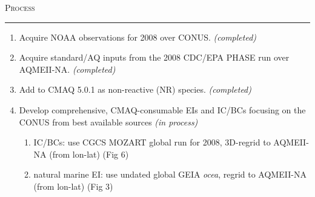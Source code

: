 \documentclass{a0poster} %
\renewcommand{\LARGE}{\fontsize{51.6}{54}\selectfont}
\def\LHead#1{\noindent\hbox{{\LARGE\color{DarkBlue}\textsc{#1}}}\vspace*{-7.6mm}\newline\rule{\textwidth}{5pt}}
\begin{document}
\begin{textblock}{45}
\LHead{Process}
    \vspace{-20mm}
    \begin{enumerate}
        \item Acquire  NOAA observations for 2008 over CONUS. \textit{(completed)}
        \item Acquire standard/AQ inputs from the 2008 CDC/EPA PHASE run over AQMEII-NA. \textit{(completed)}
        \item Add  to CMAQ 5.0.1 as non-reactive (NR) species. \textit{(completed)}
        \item Develop comprehensive, CMAQ-consumable  EIs and IC/BCs focusing on the CONUS from best available sources \textit{(in process)}
        \begin{enumerate}
            \item IC/BCs: use CGCS MOZART global run for 2008, 3D-regrid to AQMEII-NA (from lon-lat) (Fig 6)
            \item natural marine EI: use undated global GEIA \textit{ocea}, regrid to AQMEII-NA (from lon-lat) (Fig 3)

\end{enumerate}
\end{enumerate}
\end{textblock}
\end{document}
